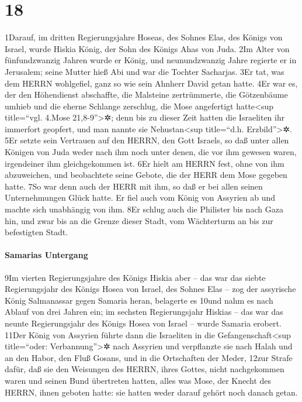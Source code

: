 \hypertarget{section-17}{%
\section{18}\label{section-17}}

1Darauf, im dritten Regierungsjahre Hoseas, des Sohnes Elas, des Königs
von Israel, wurde Hiskia König, der Sohn des Königs Ahas von Juda. 2Im
Alter von fünfundzwanzig Jahren wurde er König, und neunundzwanzig Jahre
regierte er in Jerusalem; seine Mutter hieß Abi und war die Tochter
Sacharjas. 3Er tat, was dem HERRN wohlgefiel, ganz so wie sein Ahnherr
David getan hatte. 4Er war es, der den Höhendienst abschaffte, die
Malsteine zertrümmerte, die Götzenbäume umhieb und die eherne Schlange
zerschlug, die Mose angefertigt hatte\textless sup title=``vgl. 4.Mose
21,8-9''\textgreater✲; denn bis zu dieser Zeit hatten die Israeliten ihr
immerfort geopfert, und man nannte sie Nehustan\textless sup
title=``d.h. Erzbild''\textgreater✲. 5Er setzte sein Vertrauen auf den
HERRN, den Gott Israels, so daß unter allen Königen von Juda weder nach
ihm noch unter denen, die vor ihm gewesen waren, irgendeiner ihm
gleichgekommen ist. 6Er hielt am HERRN fest, ohne von ihm abzuweichen,
und beobachtete seine Gebote, die der HERR dem Mose gegeben hatte. 7So
war denn auch der HERR mit ihm, so daß er bei allen seinen
Unternehmungen Glück hatte. Er fiel auch vom König von Assyrien ab und
machte sich unabhängig von ihm. 8Er schlug auch die Philister bis nach
Gaza hin, und zwar bis an die Grenze dieser Stadt, vom Wächterturm an
bis zur befestigten Stadt.

\hypertarget{samarias-untergang}{%
\paragraph{Samarias Untergang}\label{samarias-untergang}}

9Im vierten Regierungsjahre des Königs Hiskia aber -- das war das siebte
Regierungsjahr des Königs Hosea von Israel, des Sohnes Elas -- zog der
assyrische König Salmanassar gegen Samaria heran, belagerte es 10und
nahm es nach Ablauf von drei Jahren ein; im sechsten Regierungsjahr
Hiskias -- das war das neunte Regierungsjahr des Königs Hosea von Israel
-- wurde Samaria erobert. 11Der König von Assyrien führte dann die
Israeliten in die Gefangenschaft\textless sup title=``oder:
Verbannung''\textgreater✲ nach Assyrien und verpflanzte sie nach Halah
und an den Habor, den Fluß Gosans, und in die Ortschaften der Meder,
12zur Strafe dafür, daß sie den Weisungen des HERRN, ihres Gottes, nicht
nachgekommen waren und seinen Bund übertreten hatten, alles was Mose,
der Knecht des HERRN, ihnen geboten hatte: sie hatten weder darauf
gehört noch danach getan.

